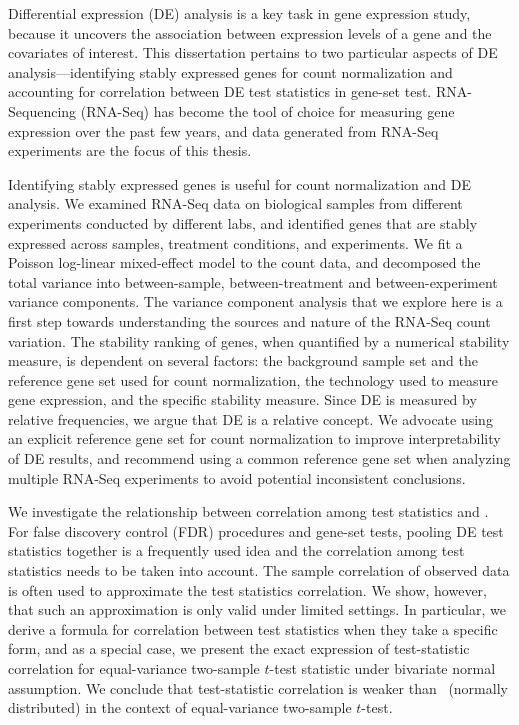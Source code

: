 
Differential expression (DE) analysis is a key task in gene expression study, because it uncovers 
the association between expression levels of a gene and the covariates of interest.
This dissertation pertains to two particular aspects of DE analysis---identifying stably expressed 
genes for count normalization and accounting for correlation between DE test statistics in gene-set 
test. RNA-Sequencing (RNA-Seq) has become the tool of choice for measuring gene expression over the 
past few years, and data generated from RNA-Seq experiments are the focus of this thesis. 

Identifying stably expressed genes is useful for count normalization and DE analysis. We examined 
RNA-Seq data on \howmanySamples biological samples from \howmanylab different experiments conducted 
by different labs, and identified genes that are stably expressed across samples, treatment 
conditions, and experiments. We fit a Poisson log-linear mixed-effect model to the count data, and 
decomposed the total variance into between-sample, between-treatment and between-experiment 
variance components. The variance 
component analysis that we explore here is a first step towards understanding the sources and 
nature of the RNA-Seq count variation. The stability ranking of genes, when quantified by a 
numerical stability measure, is dependent on several factors: the background sample set and the 
reference gene set used for count normalization, the 
technology used to measure gene expression, and the specific stability measure. Since DE is 
measured by relative frequencies, we argue that DE is a relative concept. We advocate using an 
explicit reference gene set for count normalization to improve interpretability of DE results, and 
recommend using a common reference gene set when analyzing multiple RNA-Seq experiments to avoid 
potential inconsistent conclusions.


We investigate the relationship between correlation among test statistics and \popucor. For false 
discovery control (FDR) procedures and gene-set tests, pooling DE test 
statistics together is a frequently used idea and the correlation among test statistics needs to be 
taken into account. The sample correlation of observed data is often used to approximate the 
test statistics correlation. We show, however, that such an approximation is only valid under 
limited settings. In particular, we derive a formula for correlation between test statistics when 
they take a specific form, and as a special case, we present the exact expression of test-statistic 
correlation for equal-variance two-sample $t$-test statistic under bivariate 
normal assumption. We conclude that test-statistic correlation is weaker than \popucor~(normally 
distributed) in the context of 
equal-variance two-sample $t$-test.

